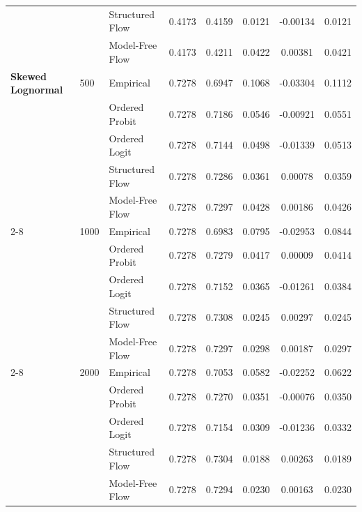 \begin{table}[p]
\begin{tabular}{lllccccc}
 &  & Structured Flow & 0.4173 & 0.4159 & 0.0121 & -0.00134 & 0.0121 \\
 &  & Model-Free Flow & 0.4173 & 0.4211 & 0.0422 & 0.00381 & 0.0421 \\
\midrule
\textbf{Skewed Lognormal} & 500 & Empirical & 0.7278 & 0.6947 & 0.1068 & -0.03304 & 0.1112 \\
 &  & Ordered Probit & 0.7278 & 0.7186 & 0.0546 & -0.00921 & 0.0551 \\
 &  & Ordered Logit & 0.7278 & 0.7144 & 0.0498 & -0.01339 & 0.0513 \\
 &  & Structured Flow & 0.7278 & 0.7286 & 0.0361 & 0.00078 & 0.0359 \\
 &  & Model-Free Flow & 0.7278 & 0.7297 & 0.0428 & 0.00186 & 0.0426 \\
\cline{2-8}
 & 1000 & Empirical & 0.7278 & 0.6983 & 0.0795 & -0.02953 & 0.0844 \\
 &  & Ordered Probit & 0.7278 & 0.7279 & 0.0417 & 0.00009 & 0.0414 \\
 &  & Ordered Logit & 0.7278 & 0.7152 & 0.0365 & -0.01261 & 0.0384 \\
 &  & Structured Flow & 0.7278 & 0.7308 & 0.0245 & 0.00297 & 0.0245 \\
 &  & Model-Free Flow & 0.7278 & 0.7297 & 0.0298 & 0.00187 & 0.0297 \\
\cline{2-8}
 & 2000 & Empirical & 0.7278 & 0.7053 & 0.0582 & -0.02252 & 0.0622 \\
 &  & Ordered Probit & 0.7278 & 0.7270 & 0.0351 & -0.00076 & 0.0350 \\
 &  & Ordered Logit & 0.7278 & 0.7154 & 0.0309 & -0.01236 & 0.0332 \\
 &  & Structured Flow & 0.7278 & 0.7304 & 0.0188 & 0.00263 & 0.0189 \\
 &  & Model-Free Flow & 0.7278 & 0.7294 & 0.0230 & 0.00163 & 0.0230 \\
\bottomrule
\end{tabular}
\end{table}
